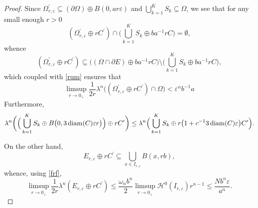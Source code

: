\documentclass[10pt,a4paper]{amsart}
\DeclareMathOperator{\diam}{\textup{diam}}
\begin{document}
\begin{proof}
Since $\Omega^{\prime}_{r, \varepsilon}\subseteq (\partial\Omega)\oplus B(0, ar\varepsilon)$ and $\bigcup_{k=1}^K S_k\subseteq\Omega$, we see that for any small enough $r>0$  $$(\Omega^{\prime}_{r, \varepsilon}\oplus rC^{\prime})\cap \Big(\bigcup_{k=1}^K S_k\oplus ba^{-1}rC\Big)=\emptyset,$$ whence $$(\Omega^{\prime}_{r, \varepsilon}\oplus rC^{\prime})\subseteq \big((\Omega\cap\partial E)\oplus ba^{-1}rC\big)\setminus\Big(\bigcup_{k=1}^K S_k\oplus ba^{-1}rC\Big),$$ which coupled with \eqref{rum} ensures that \begin{equation}\label{rumík}
    \limsup_{r\to0_+}\frac{1}{2r}\lambda^n\big((\Omega^{\prime}_{r, \varepsilon}\oplus rC^{\prime})\cap\Omega\big)<\varepsilon^n b^{-1}a
\end{equation} Furthermore, \begin{equation}\label{rumcajs}
    \begin{split}
        \lambda^n\bigg(\Big(\bigcup_{k=1}^K S_k\oplus B\big(0, 3\diam(C)\varepsilon r\big)\Big) \oplus rC^{\prime}\bigg)\leq \lambda^n\Big(\bigcup_{k=1}^K S_k\oplus r\big(1+c^{-1}3\diam(C)\varepsilon\big)C^{\prime}\Big).
    \end{split}
\end{equation}


On the other hand, 
\[
E_{r, \varepsilon} \oplus rC^{\prime}\subseteq \bigcup_{x\in I_{r, \varepsilon}} B(x, rb),
\]
whence, using \eqref{frf}, \begin{equation}\label{konec}
    \limsup_{r\to0_+}\frac{1}{2r}\lambda^n(E_{r, \varepsilon} \oplus rC^{\prime})\leq\frac{\omega_n b^n}{2}\limsup_{r\to0_+}\mathcal{H}^0(I_{r, \varepsilon})r^{n-1}\leq \frac{N b^n\varepsilon}{a^n}.\end{equation}


\end{proof}
\end{document}
